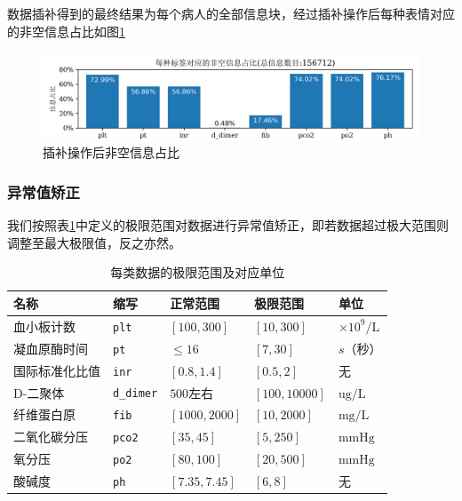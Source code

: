 \documentclass[12pt, a4paper, oneside]{ctexart}
\numberwithin{equation}{section}  %
\let\leq=\leqslant %
\begin{document}
数据插补得到的最终结果为每个病人的全部信息块，经过插补操作后每种表情对应的非空信息占比如图\ref{fig-interpolation}
\vspace{-1em}
\begin{figure}[H]
    \hspace{-1.5cm}
    \includegraphics[scale=0.21]{info_vs_ratio_label_plot}
    \caption{插补操作后非空信息占比}
    \label{fig-interpolation}
\end{figure}
\subsubsection{异常值矫正}
我们按照表\ref{table-limit}中定义的极限范围对数据进行异常值矫正，即若数据超过极大范围则调整至最大极限值，反之亦然。
\renewcommand\arraystretch{1.2} %
\begin{table}[H] %
    \centering %
    \begin{tabular}{p{}p{}p{}<{\centering}
        p{}<{\centering}p{}} %
        \toprule
        \textbf{名称}&\textbf{缩写}&\textbf{正常范围}&\textbf{极限范围}&\textbf{单位}\\
        \midrule
        血小板计数&\texttt{plt}&$[100,300]$&$[10,300]$&$\times 10^9/\text{L}$\\
        凝血原酶时间&\texttt{pt}&$\leq 16$&$[7,30]$&$s$（秒）\\
        国际标准化比值&\texttt{inr}&$[0.8,1.4]$&$[0.5,2]$&无\\
        D-二聚体&\texttt{d\_dimer}&$500$左右&$[100,10000]$&$\text{ug}/\text{L}$\\
        纤维蛋白原&\texttt{fib}&$[1000,2000]$&$[10,2000]$&$\text{mg}/\text{L}$\\
        二氧化碳分压&\texttt{pco2}&$[35,45]$&$[5,250]$&$\text{mmHg}$\\
        氧分压&\texttt{po2}&$[80,100]$&$[20,500]$&$\text{mmHg}$\\
        酸碱度&\texttt{ph}&$[7.35,7.45]$&$[6,8]$&无\\
        \bottomrule
    \end{tabular}
    \caption{每类数据的极限范围及对应单位}
    \label{table-limit}
\end{table}
\end{document}
